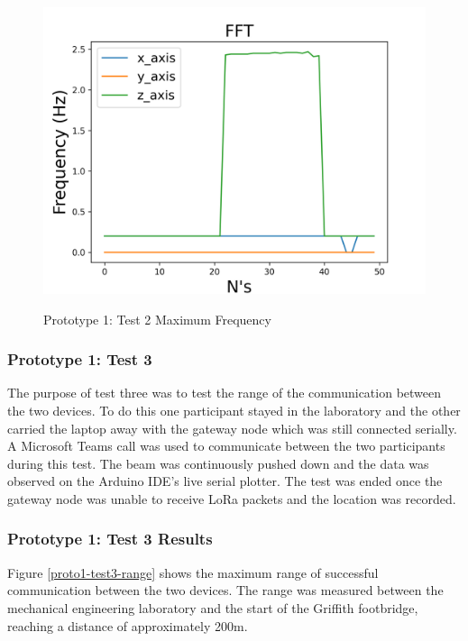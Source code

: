 \begin{figure}[H]
	\centering
	\caption{Prototype 1: Test 2 Maximum Frequency}
	\includegraphics[width=.9\textwidth]{Sections/Prototype-Testing/test2-f.png}
	\label{proto1-test2-f}
\end{figure}

\subsubsection{Prototype 1: Test 3}
The purpose of test three was to test the range of the communication between the two devices. To do this one participant stayed in the laboratory and the other carried the laptop away with the gateway node which was still connected serially. A Microsoft Teams call was used to communicate between the two participants during this test. The beam was continuously pushed down and the data was observed on the Arduino IDE's live serial plotter. The test was ended once the gateway node was unable to receive LoRa packets and the location was recorded. 

\subsubsection{Prototype 1: Test 3 Results}
Figure \ref{proto1-test3-range} shows the maximum range of successful communication between the two devices. The range was measured between the mechanical engineering laboratory and the start of the Griffith footbridge, reaching a distance of approximately 200m. 


